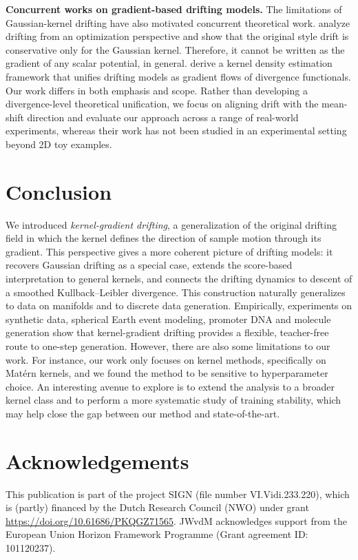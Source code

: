 \documentclass{article}
\theoremstyle{plain}
\begin{document}
\textbf{Concurrent works on gradient-based drifting models.} The limitations of Gaussian-kernel drifting have also motivated concurrent theoretical work. \citet{Franz_2026_DriftingFields} analyze drifting from an optimization perspective and show that the original \citep{Deng_2026_Drift} style drift is conservative only for the Gaussian kernel. Therefore, it cannot be
written as the gradient of any scalar potential, in general. \citet{Cao_2026_GradientFlowDrifting} derive a kernel density estimation framework that unifies drifting models as gradient flows of divergence functionals. Our work differs in both emphasis and scope. Rather than developing a divergence-level theoretical unification, we focus on aligning drift with the mean-shift direction and evaluate our approach across a range of real-world experiments, whereas their work has not been studied in an experimental setting beyond 2D toy examples.

\section{Conclusion}
\label{sec:discussion_conclusion}
We introduced \emph{kernel-gradient drifting}, a generalization of the original drifting field in which the kernel defines the direction of sample motion through its gradient. This perspective gives a more coherent picture of drifting models: it recovers Gaussian drifting as a special case, extends the score-based interpretation to general kernels, and connects the drifting dynamics to descent of a smoothed Kullback--Leibler divergence. This construction naturally generalizes to data on manifolds and to discrete data generation. Empirically, experiments on synthetic data, spherical Earth event modeling, promoter DNA and molecule generation show that kernel-gradient drifting provides a flexible, teacher-free route to one-step generation. However, there are also some limitations to our work. For instance, our work only focuses on kernel methods, specifically on Matérn kernels, and we found the method to be sensitive to hyperparameter choice. An interesting avenue to explore is to extend the analysis to a broader kernel class and to perform a more systematic study of training stability, which may help close the gap between our method and state-of-the-art. 

\newpage
\section*{Acknowledgements}
This publication is part of the project SIGN (file number VI.Vidi.233.220), which is (partly) financed by the Dutch Research Council (NWO) under grant \url{https://doi.org/10.61686/PKQGZ71565}. JWvdM acknowledges support from the European Union Horizon Framework Programme (Grant agreement ID: 101120237). 
\end{document}
